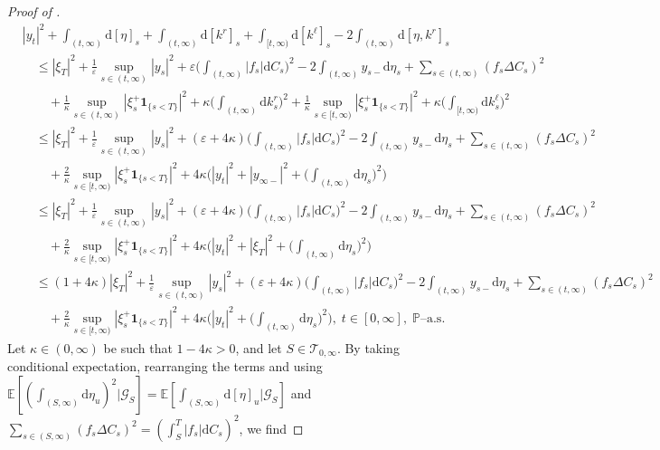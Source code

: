 \documentclass[10pt]{article} %
\newcommand\cG{\mathcal G}
\newcommand\cT{\mathcal T}
\def \E{\mathbb{E}}
\def \P{\mathbb{P}}
\newcommand{\1}{\mathbf{1}}
\def\d{\mathrm{d}}
\begin{document}
\begin{proof}[Proof of ]
\begin{align}\label{eq::inequality_pathwise_without_delta}
	&|y_t|^2 + \int_{(t,\infty)}\d[\eta]_s + \int_{(t,\infty)}\d[k^r]_s + \int_{[t,\infty)} \d[k^\ell]_s - 2\int_{(t,\infty)}\d[\eta, k^r]_s \nonumber\\ 
	&\quad \leq |\xi_T|^2 + \frac{1}{\varepsilon}\sup_{s \in (t,\infty)} |y_s|^2 + \varepsilon\bigg(\int_{(t,\infty)} |f_s| \d C_s\bigg)^2 - 2 \int_{(t,\infty)} y_{s-} \d\eta_s + \sum_{s \in (t,\infty)} (f_s\Delta C_s)^2 \nonumber\\
	&\quad\quad + \frac{1}{\kappa} \sup_{s \in (t,\infty)} |\xi^+_s\mathbf{1}_{\{s < T\}}|^2  + \kappa \bigg(\int_{(t,\infty)} \d k^r_s \bigg)^2 + \frac{1}{\kappa} \sup_{s \in [t,\infty)} |\xi^+_s \mathbf{1}_{\{s < T\}}|^2  + \kappa \bigg(\int_{[t,\infty)} \d k^\ell_s \bigg)^2 \nonumber\\
	&\quad \leq |\xi_T|^2 + \frac{1}{\varepsilon}\sup_{s \in (t,\infty)} |y_s|^2 +(\varepsilon+4\kappa)\bigg(\int_{(t,\infty)} |f_s| \d C_s\bigg)^2 - 2 \int_{(t,\infty)} y_{s-} \d\eta_s + \sum_{s \in (t,\infty)} (f_s\Delta C_s)^2 \nonumber\\
	&\quad\quad + \frac{2}{\kappa} \sup_{s \in [t,\infty)} |\xi^+_s\mathbf{1}_{\{s < T\}}|^2 + 4\kappa \bigg( |y_t|^2 + |y_{\infty-}|^2 + \bigg(\int_{(t,\infty)} \d \eta_s\bigg)^2 \bigg) \nonumber\\
	&\quad \leq |\xi_T|^2 + \frac{1}{\varepsilon}\sup_{s \in (t,\infty)} |y_s|^2 +(\varepsilon+4\kappa)\bigg(\int_{(t,\infty)} |f_s| \d C_s\bigg)^2 - 2 \int_{(t,\infty)} y_{s-} \d\eta_s + \sum_{s \in (t,\infty)} (f_s\Delta C_s)^2 \nonumber\\
	&\quad\quad + \frac{2}{\kappa} \sup_{s \in [t,\infty)} |\xi^+_s\mathbf{1}_{\{s < T\}}|^2 + 4\kappa \bigg( |y_t|^2 + |\xi_T|^2 + \bigg(\int_{(t,\infty)} \d \eta_s\bigg)^2 \bigg) \nonumber\\
	&\quad \leq (1+4\kappa)|\xi_T|^2 + \frac{1}{\varepsilon}\sup_{s \in (t,\infty)} |y_s|^2 +(\varepsilon+4\kappa)\bigg(\int_{(t,\infty)} |f_s| \d C_s\bigg)^2 - 2 \int_{(t,\infty)} y_{s-} \d\eta_s + \sum_{s \in (t,\infty)} (f_s\Delta C_s)^2 \nonumber\\
	&\quad\quad + \frac{2}{\kappa} \sup_{s \in [t,\infty)} |\xi^+_s\mathbf{1}_{\{s < T\}}|^2 + 4\kappa \bigg( |y_t|^2 + \bigg(\int_{(t,\infty)} \d \eta_s\bigg)^2 \bigg), \; t \in [0,\infty], \; \text{$\P$--a.s.}
\end{align}
Let $\kappa \in (0,\infty)$ be such that $1-4\kappa > 0$, and let $S \in \cT_{0,\infty}$. By taking conditional expectation, rearranging the terms and using $\E[(\int_{(S,\infty)}\d\eta_u)^2|\cG_S] = \E[\int_{(S,\infty)}\d[\eta]_u|\cG_S]$ and $\sum_{s \in (S,\infty)} (f_s\Delta C_s)^2 = (\int_S^T |f_s| \d C_s)^2$, we find


\end{proof}
\end{document}
